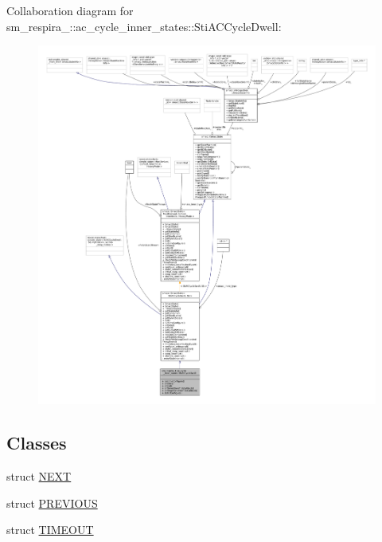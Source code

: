 Collaboration diagram for sm\+\_\+respira\+\_\+:\+:ac\+\_\+cycle\+\_\+inner\+\_\+states\+:\+:Sti\+A\+C\+Cycle\+Dwell\+:
\nopagebreak
\begin{figure}[H]
\begin{center}
\leavevmode
\includegraphics[width=350pt]{structsm__respira__1_1_1ac__cycle__inner__states_1_1StiACCycleDwell__coll__graph}
\end{center}
\end{figure}
\subsection*{Classes}
\begin{DoxyCompactItemize}
\item 
struct \hyperlink{structsm__respira__1_1_1ac__cycle__inner__states_1_1StiACCycleDwell_1_1NEXT}{N\+E\+XT}
\item 
struct \hyperlink{structsm__respira__1_1_1ac__cycle__inner__states_1_1StiACCycleDwell_1_1PREVIOUS}{P\+R\+E\+V\+I\+O\+US}
\item 
struct \hyperlink{structsm__respira__1_1_1ac__cycle__inner__states_1_1StiACCycleDwell_1_1TIMEOUT}{T\+I\+M\+E\+O\+UT}
\end{DoxyCompactItemize}
